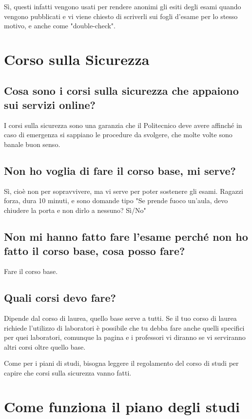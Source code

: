 \documentclass[legal]{polinetwork}
\begin{document}
Sì, questi infatti vengono usati per rendere anonimi gli esiti degli esami quando vengono pubblicati e vi viene chiesto di scriverli sui fogli d'esame per lo stesso motivo, e anche come "double-check".

\section{Corso sulla Sicurezza}


\subsection{Cosa sono i corsi sulla sicurezza che appaiono sui servizi online?}


I corsi sulla sicurezza sono una garanzia che il Politecnico deve avere affinché in caso di emergenza si sappiano le procedure da svolgere, che molte volte sono banale buon senso.

\subsection{Non ho voglia di fare il corso base, mi serve?}


Sì, cioè non per sopravvivere, ma vi serve per poter sostenere gli esami. Ragazzi forza, dura 10 minuti, e sono domande tipo "Se prende fuoco un'aula, devo chiudere la porta e non dirlo a nessuno? Sì/No"

\subsection{Non mi hanno fatto fare l'esame perché non ho fatto il corso base, cosa posso fare?}


Fare il corso base.

\subsection{Quali corsi devo fare?}


Dipende dal corso di laurea, quello base serve a tutti. Se il tuo corso di laurea richiede l'utilizzo di laboratori è possibile che tu debba fare anche quelli specifici per quei laboratori, comunque la pagina e i professori vi diranno se vi serviranno altri corsi oltre quello base.

Come per i piani di studi, bisogna leggere il regolamento del corso di studi per capire che corsi sulla sicurezza vanno fatti.

\section{Come funziona il piano degli studi}
\end{document}
